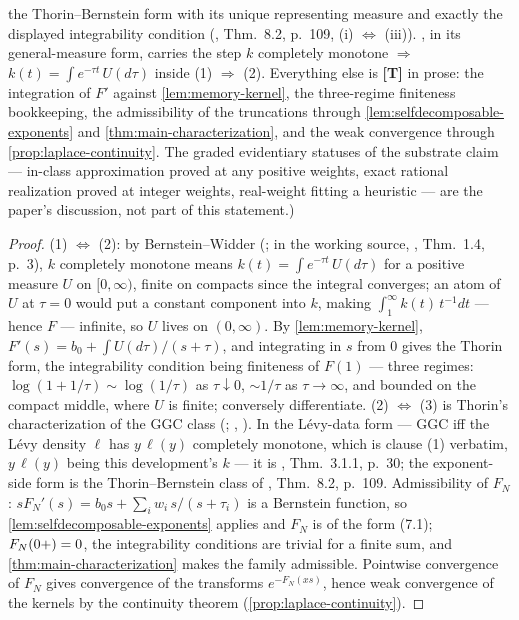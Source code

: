 \begin{proposition}
{the Thorin--Bernstein form with its unique representing measure and exactly the displayed
integrability condition (, Thm.~8.2, p.~109, (i)
$\Leftrightarrow$ (iii)). , in its general-measure form, carries the step $k$
completely monotone $\Rightarrow$ $k(t) = \int e^{-\tau t}\,U(d\tau)$ inside (1)
$\Rightarrow$ (2). Everything else is \textbf{[T]} in prose: the integration of $F'$
against \ref{lem:memory-kernel}, the three-regime finiteness bookkeeping, the
admissibility of the truncations through \ref{lem:selfdecomposable-exponents} and
\ref{thm:main-characterization}, and the weak convergence through
\ref{prop:laplace-continuity}. The graded evidentiary statuses of the substrate claim ---
in-class approximation proved at any positive weights, exact rational realization proved
at integer weights, real-weight fitting a heuristic --- are the paper's discussion, not
part of this statement.)}
\end{proposition}

\begin{proof}
(1) $\Leftrightarrow$ (2): by Bernstein--Widder (; in the working source,
, Thm.~1.4, p.~3), $k$ completely monotone means
$k(t) = \int e^{-\tau t}\,U(d\tau)$ for a
positive measure $U$ on $[0,\infty)$, finite on compacts since the integral converges; an
atom of $U$ at $\tau = 0$ would put a constant component into $k$, making
$\int_1^\infty k(t)\,t^{-1}dt$ --- hence $F$ --- infinite, so $U$ lives on $(0,\infty)$. By
\ref{lem:memory-kernel},
$F'(s) = b_0 + \int U(d\tau)/(s + \tau)$, and integrating in $s$ from $0$ gives the Thorin
form, the integrability condition being finiteness of $F(1)$ --- three regimes:
$\log(1+1/\tau) \sim \log(1/\tau)$ as $\tau \downarrow 0$, $\sim 1/\tau$ as
$\tau \to \infty$, and bounded on the compact middle, where $U$ is finite; conversely
differentiate.
(2) $\Leftrightarrow$ (3) is Thorin's characterization of the GGC class
(; , ). In the L\'evy-data
form --- GGC iff the L\'evy density $\ell$ has $y\,\ell(y)$ completely monotone, which is
clause (1) verbatim, $y\,\ell(y)$ being this development's $k$ --- it is
, Thm.~3.1.1, p.~30; the exponent-side form is the
Thorin--Bernstein class of , Thm.~8.2, p.~109.
Admissibility of $F_N$: $sF_N'(s) = b_0 s + \sum_i w_i\, s/(s + \tau_i)$ is a Bernstein
function, so \ref{lem:selfdecomposable-exponents} applies and $F_N$ is of the form
(7.1); $F_N(0{+}) = 0$, the integrability conditions are trivial for a finite sum, and
\ref{thm:main-characterization} makes the family admissible. Pointwise
convergence of $F_N$ gives convergence of the transforms $e^{-F_N(xs)}$, hence weak
convergence of the kernels by the continuity theorem
(\ref{prop:laplace-continuity}).
\end{proof}

